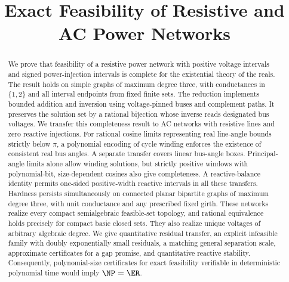 \documentclass[11pt]{article}
\title{Exact Feasibility of Resistive and AC Power Networks}
\author{}
\date{}
\begin{document}
\maketitle
\begin{abstract}
We prove that feasibility of a resistive power network with positive voltage
intervals and signed power-injection intervals is complete for the existential
theory of the reals. The result holds on simple graphs of maximum degree three,
with conductances in $\{1,2\}$ and all interval endpoints from fixed finite sets.
The reduction implements bounded addition and inversion using voltage-pinned
buses and complement paths. It preserves the solution set by a rational
bijection whose inverse reads designated bus voltages. We transfer this
completeness result to AC networks with resistive lines and zero reactive
injections. For rational cosine limits representing real line-angle bounds
strictly below $\pi$, a polynomial encoding of cycle winding enforces the
existence of consistent real bus angles. A separate transfer covers linear
bus-angle boxes. Principal-angle limits alone allow winding solutions, but
strictly positive windows with polynomial-bit, size-dependent cosines also
give completeness. A reactive-balance identity permits one-sided
positive-width reactive intervals in all these transfers. Hardness persists
simultaneously on connected planar bipartite graphs of maximum degree three,
with unit conductance and any prescribed fixed girth. These networks realize
every compact semialgebraic feasible-set topology, and rational equivalence
holds precisely for compact basic closed sets. They also realize unique voltages of
arbitrary algebraic degree. We give quantitative residual transfer, an
explicit infeasible family with doubly exponentially small residuals, a
matching general separation scale, approximate certificates for a gap
promise, and quantitative reactive stability. Consequently,
polynomial-size certificates for exact
feasibility verifiable in deterministic polynomial time would imply
$\NP=\ER$.
\end{abstract}






\appendix



\end{document}
